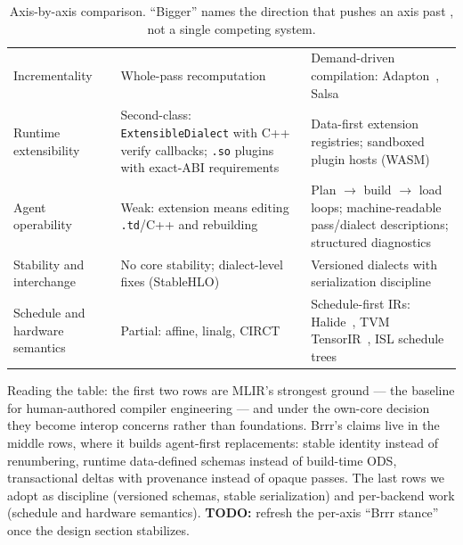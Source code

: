 \begin{table}[t]
\begin{tabularx}{\textwidth}{@{}>{\raggedright\arraybackslash}p{2.6cm} >{\raggedright\arraybackslash}X >{\raggedright\arraybackslash}X@{}}
  Incrementality &
  Whole-pass recomputation &
  Demand-driven compilation: Adapton~\cite{hammer2014adapton},
  Salsa~\cite{salsa} \\
  Runtime extensibility &
  Second-class: \texttt{ExtensibleDialect} with C++ verify callbacks;
  \texttt{.so} plugins with exact-ABI requirements &
  Data-first extension registries; sandboxed plugin hosts (WASM) \\
  Agent operability &
  Weak: extension means editing \texttt{.td}/C++ and rebuilding &
  Plan $\rightarrow$ build $\rightarrow$ load loops; machine-readable
  pass/dialect descriptions; structured diagnostics \\
  Stability and interchange &
  No core stability; dialect-level fixes (StableHLO)~\cite{stablehlo} &
  Versioned dialects with serialization discipline \\
  Schedule and hardware semantics &
  Partial: affine, linalg, CIRCT &
  Schedule-first IRs: Halide~\cite{ragankelley2013halide},
  TVM TensorIR~\cite{zheng2023tensorir}, ISL schedule trees \\
  \bottomrule
  \end{tabularx}
  \caption{Axis-by-axis comparison. ``Bigger'' names the direction that pushes an axis
  past \mlir{}, not a single competing system.}
  \label{tab:landscape}
\end{table}

Reading the table: the first two rows are MLIR's strongest ground --- the baseline for
human-authored compiler engineering --- and under the own-core decision they become
interop concerns rather than foundations. Brrr's claims live in the middle rows,
where it builds agent-first replacements: stable identity instead of renumbering,
runtime data-defined schemas instead of build-time ODS, transactional deltas with
provenance instead of opaque passes. The last rows we adopt as discipline (versioned
schemas, stable serialization) and per-backend work (schedule and hardware semantics).
{\color{red}\textbf{TODO:} refresh the per-axis ``Brrr stance'' once the design
section stabilizes.}
